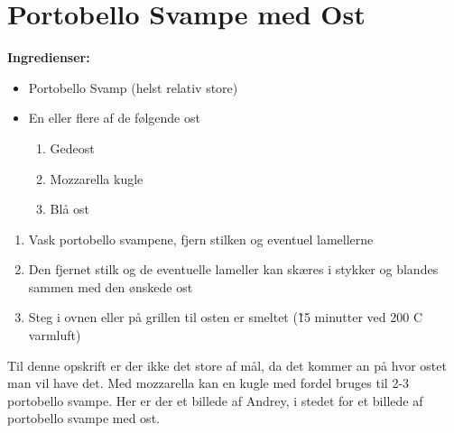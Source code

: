 \documentclass{book}
\begin{document}
\newpage 
{}
\newpage\section{Portobello Svampe med Ost}
\begin{minipage}[t]{0.5\textwidth}
\textbf{Ingredienser:}
\begin{itemize}
    \item Portobello Svamp (helst relativ store)
    \item En eller flere af de følgende ost
    \begin{enumerate}
        \item Gedeost
        \item Mozzarella kugle
        \item Blå ost
    \end{enumerate}
\end{itemize}
\end{minipage}
\begin{minipage}[t]{0.5\textwidth}
\begin{enumerate}
    \item Vask portobello svampene, fjern stilken og eventuel lamellerne
    \item Den fjernet stilk og de eventuelle lameller kan skæres i stykker og blandes sammen med den ønskede ost
    \item Steg i ovnen eller på grillen til osten er smeltet (\~15 minutter ved 200 \degree C varmluft)
\end{enumerate}
\end{minipage}
Til denne opskrift er der ikke det store af mål, da det kommer an på hvor ostet man vil have det. Med mozzarella kan en kugle med fordel bruges til 2-3 portobello svampe.
\newpage Her er der et billede af Andrey, i stedet for et billede af portobello svampe med ost.
\end{document}

